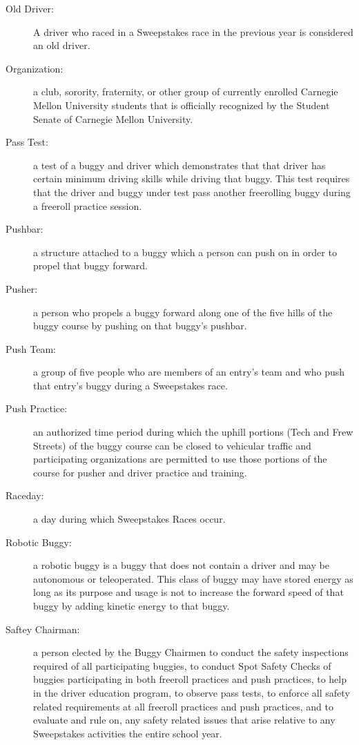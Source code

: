 \begin{description}
    \item [Old Driver:] 
	A driver who raced in a Sweepstakes race in the previous year is considered an old driver.

	\item[Organization:]
	a club, sorority, fraternity, or other group of currently enrolled Carnegie Mellon University students that is officially recognized by the Student Senate of Carnegie Mellon University.

	\item[Pass Test:]
	a test of a buggy and driver which demonstrates that that driver has certain minimum driving skills while driving that buggy. This test requires that the driver and buggy under test pass another freerolling buggy during a freeroll practice session.

	\item[Pushbar:]
	a structure attached to a buggy which a person can push on in order to propel that buggy forward. 

	\item[Pusher:]
	a person who propels a buggy forward along one of the five hills of the buggy course by pushing on that buggy's pushbar.

	\item[Push Team:]
	a group of five people who are members of an entry's team and who push that entry's buggy during a Sweepstakes race.

	\item[Push Practice:]
	an authorized time period during which the uphill portions (Tech and Frew Streets) of the buggy course can be closed to vehicular traffic and participating organizations are permitted to use those portions of the course for pusher and driver practice and training.

	\item[Raceday:]
	a day during which Sweepstakes Races occur.

	\item[Robotic Buggy:]
	a robotic buggy is a buggy that does not contain a driver and may be autonomous or teleoperated. This class of buggy may have stored energy as long as its purpose and usage is not to increase the forward speed of that buggy by adding kinetic energy to that buggy. 

	\item[Saftey Chairman:]
	a person elected by the Buggy Chairmen to conduct the safety inspections required of all participating buggies, to conduct Spot Safety Checks of buggies participating in both freeroll practices and push practices, to help in the driver education program, to observe pass tests, to enforce all safety related requirements at all freeroll practices and push practices, and to evaluate and rule on, any safety related issues that arise relative to any Sweepstakes activities the entire school year.


\end{description}
